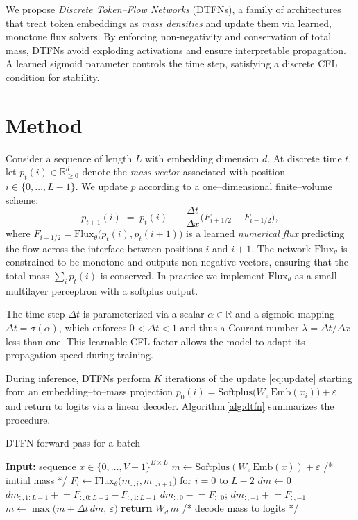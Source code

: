 \documentclass[10pt]{article}
\begin{document}
We propose \emph{Discrete Token--Flow Networks} (DTFNs), a family of
architectures that treat token embeddings as \emph{mass densities} and update
them via learned, monotone flux solvers. By enforcing non‑negativity and
conservation of total mass, DTFNs avoid exploding activations and ensure
interpretable propagation. A learned sigmoid parameter controls the time step,
satisfying a discrete CFL condition for stability.

\section{Method}
Consider a sequence of length $L$ with embedding dimension $d$. At discrete
time $t$, let $p_t(i)\in \mathbb{R}^d_{\geq 0}$ denote the \emph{mass vector}
associated with position $i\in\{0,\dots,L-1\}$. We update $p$ according to a
one–dimensional finite–volume scheme:
\begin{equation}
    p_{t+1}(i) \;=\; p_t(i) \; - \; \frac{\Delta t}{\Delta x}
    \bigl(F_{i+1/2} - F_{i-1/2}\bigr),
    \label{eq:update}
\end{equation}
where $F_{i+1/2} = \mathrm{Flux}_\theta\bigl(p_t(i), p_t(i+1)\bigr)$ is a
learned \emph{numerical flux} predicting the flow across the interface between
positions $i$ and $i+1$. The network $\mathrm{Flux}_\theta$ is constrained to
be monotone and outputs non‑negative vectors, ensuring that the total mass
$\sum_i p_t(i)$ is conserved. In practice we implement $\mathrm{Flux}_\theta$
as a small multilayer perceptron with a softplus output.

The time step $\Delta t$ is parameterized via a scalar $\alpha\in\mathbb{R}$
and a sigmoid mapping $\Delta t = \sigma(\alpha)$, which enforces
$0<\Delta t<1$ and thus a Courant number $\lambda=\Delta t/\Delta x$ less
than one. This learnable CFL factor allows the model to adapt its propagation
speed during training.

During inference, DTFNs perform $K$ iterations of the update
\eqref{eq:update} starting from an embedding–to–mass projection $p_0(i) =
\mathrm{Softplus}\bigl(W_e\,\mathrm{Emb}(x_i)\bigr) + \varepsilon$ and
return to logits via a linear decoder. Algorithm\,\ref{alg:dtfn} summarizes
the procedure.

\begin{algorithm}[t]
    \caption{DTFN forward pass for a batch}
    \label{alg:dtfn}
    \begin{algorithmic}[1]
        \STATE \textbf{Input:} sequence $x\in \{0,\dots,V-1\}^{B\times L}$
        \STATE $m \leftarrow \mathrm{Softplus}(W_e\,\mathrm{Emb}(x)) + \varepsilon$ \hfill/* initial mass */
            \STATE $F_i \leftarrow \mathrm{Flux}_\theta\bigl(m_{:,i}, m_{:,i+1}\bigr)$ for $i=0$ to $L-2$
            \STATE $dm \leftarrow 0$
            \STATE $dm_{:,1:L-1} \mathrel{+}= F_{:,0:L-2} - F_{:,1:L-1}$
            \STATE $dm_{:,0} \mathrel{-}= F_{:,0}$; \quad $dm_{:,-1} \mathrel{+}= F_{:,-1}$
            \STATE $m \leftarrow \max\bigl(m + \Delta t\, dm,\,\varepsilon\bigr)$
        \ENDFOR
        \STATE \textbf{return} $W_d\,m$ \hfill/* decode mass to logits */
    \end{algorithmic}
\end{algorithm}
\end{document}
